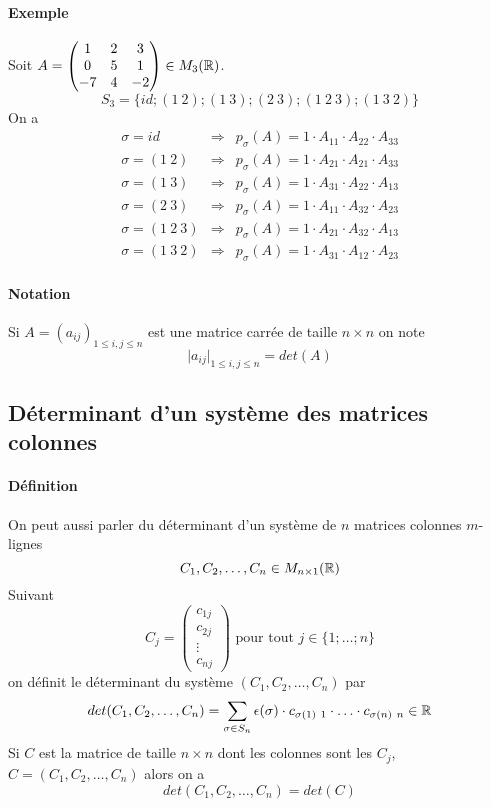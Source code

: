 \paragraph{Exemple} Soit $A = \begin{pmatrix} 1 & 2 & 3 \\ 0 & 5 & 1 \\ -7 & 4 & -2 \end{pmatrix} \in M_{3}(\mathbb{R})$.
$$S_3 = \{id; (1 ~ 2); (1 ~ 3); (2 ~ 3); (1 ~ 2 ~ 3); (1 ~ 3 ~ 2)\}$$
On a 
\begin{eqnarray*}
  \sigma = id           &\Rightarrow& p_{\sigma}(A) = 1 \cdot A_{11} \cdot A_{22} \cdot A_{33} \\
  \sigma = (1 ~ 2)      &\Rightarrow& p_{\sigma}(A) = 1 \cdot A_{21} \cdot A_{21} \cdot A_{33} \\
  \sigma = (1 ~ 3)      &\Rightarrow& p_{\sigma}(A) = 1 \cdot A_{31} \cdot A_{22} \cdot A_{13} \\
  \sigma = (2 ~ 3)      &\Rightarrow& p_{\sigma}(A) = 1 \cdot A_{11} \cdot A_{32} \cdot A_{23} \\
  \sigma = (1 ~ 2 ~ 3)  &\Rightarrow& p_{\sigma}(A) = 1 \cdot A_{21} \cdot A_{32} \cdot A_{13} \\
  \sigma = (1 ~ 3 ~ 2)  &\Rightarrow& p_{\sigma}(A) = 1 \cdot A_{31} \cdot A_{12} \cdot A_{23}
\end{eqnarray*}

\paragraph{Notation} Si $A = (a_{ij})_{1 \leq i, j\leq n}$ est une matrice carrée de taille $n\times n$ on note
$$\vert a_{ij} \vert _{1 \leq i, j \leq n} = det(A)$$

%
\subsection{Déterminant d'un système des matrices colonnes}
%
\paragraph{Définition} On peut aussi parler du déterminant d'un système de $n$ matrices colonnes $m$-lignes
$$C_1, C_2, \ldots, C_n  \in M_{n\times 1}(\mathbb{R})$$
Suivant
$$C_{j} = \begin{pmatrix} c_{1j} \\ c_{2j} \\ \vdots \\ c_{nj} \end{pmatrix} \text{ pour tout } j \in \{1; \ldots ; n\}$$
on définit le déterminant du système $(C_1, C_2, \ldots, C_n)$ par
$$det(C_1, C_2, \ldots, C_n) = \sum_{\sigma \in S_n} \epsilon(\sigma) \cdot c_{\sigma(1) ~ 1} \cdot \ldots \cdot c_{\sigma(n) ~ n} \in \mathbb{R}$$
Si $C$ est la matrice de taille $n \times n$ dont les colonnes sont les $C_j$, $C = (C_1, C_2, \ldots, C_n)$ alors on a
$$det(C_1, C_2, \ldots, C_n) = det(C)$$

